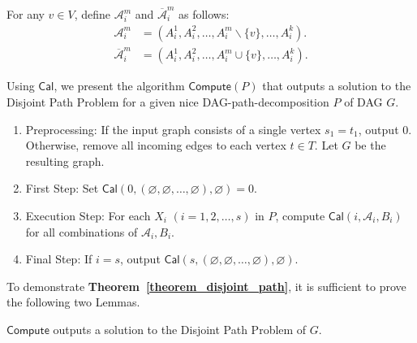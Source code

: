 \documentclass[runningheads]{llncs}
\theoremstyle{plain}
\theoremstyle{definition}
\begin{document}
For any $v \in V$, define $\mathscr{A}^m_i$ and $\mathscr{\overline{A}}^m_i$ as follows:
\begin{align*}
    \mathscr{A}^m_i &= (A^1_i, A^2_i,  \dots, A^m_i \backslash \{v\}, \dots, A^k_i). \\
    \mathscr{\overline{A}}^m_i &= (A^1_i, A^2_i,  \dots, A^m_i \cup \{v\}, \dots, A^k_i).
\end{align*}

Using $\mathsf{Cal}$, we present the algorithm $\mathsf{Compute}(P)$ that outputs a solution to the Disjoint Path Problem for a given nice DAG-path-decomposition $P$ of DAG $G$.

\begin{enumerate}
    \item Preprocessing: If the input graph consists of a single vertex $s_1 = t_1$, output 0. Otherwise, remove all incoming edges to each vertex $t \in T$. Let $G$ be the resulting graph.
    \item First Step: Set $\mathsf{Cal}(0, (\varnothing, \varnothing, \dots, \varnothing), \varnothing) = 0$.
    \item Execution Step: For each $X_i$ $(i=1, 2, \dots, s)$ in $P$, compute $\mathsf{Cal}(i, \mathscr{A}_i, B_i)$ for all combinations of $\mathscr{A}_i, B_i$.
    \item Final Step: If $i = s$, output $\mathsf{Cal}(s, (\varnothing, \varnothing, \dots, \varnothing), \varnothing)$.
\end{enumerate}


To demonstrate \textbf{Theorem~\ref{theorem_disjoint_path}}, it is sufficient to prove the following two Lemmas.

\begin{lemma}\label{dpp}
    $\mathsf{Compute}$ outputs a solution to the Disjoint Path Problem of $G$.
\end{lemma}
\end{document}
